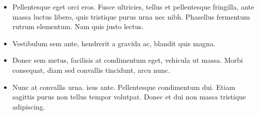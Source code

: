 \documentclass[a0,portrait]{a0poster}
\begin{document}
\begin{multicols}{2}
\begin{itemize}
\item Pellentesque eget orci eros. Fusce ultricies, tellus et pellentesque fringilla, ante massa luctus libero, quis tristique purus urna nec nibh. Phasellus fermentum rutrum elementum. Nam quis justo lectus.
\item Vestibulum sem ante, hendrerit a gravida ac, blandit quis magna.
\item Donec sem metus, facilisis at condimentum eget, vehicula ut massa. Morbi consequat, diam sed convallis tincidunt, arcu nunc.
\item Nunc at convallis urna. isus ante. Pellentesque condimentum dui. Etiam sagittis purus non tellus tempor volutpat. Donec et dui non massa tristique adipiscing.
\end{itemize}

\color{DarkSlateGray} %


\nocite{*} %

\end{multicols}
\end{document}
